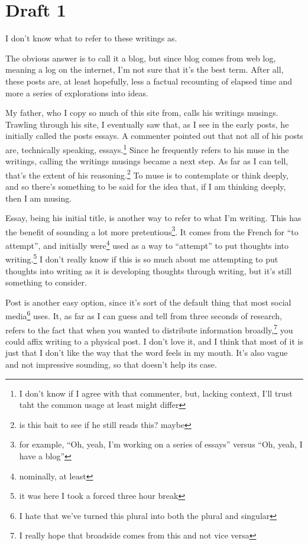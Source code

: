 \documentclass[12pt]{article}
\newcommand{\say}[1]{``#1''}
\renewcommand{\,}{\textsuperscript{,}}
\begin{document}
\section{Draft 1}

I don't know what to refer to these writings as.

The obvious answer is to call it a blog, but since blog comes from web log, meaning a log on the internet, I'm not sure that it's the best term.  
After all, these posts are, at least hopefully, less a factual recounting of elapsed time and more a series of explorations into ideas.

My father, who I copy so much of this site from, calls his writings musings.  
Trawling through his site, I eventually saw that, as I see in the early posts, he initially called the posts essays.  
A commenter pointed out that not all of his posts are, technically speaking, essays.\footnote{I don't know if I agree with that commenter, but, lacking context, I'll trust taht the common usage at least might differ}  
Since he frequently refers to his muse in the writings, calling the writings musings became a next step.  
As far as I can tell, that's the extent of his reasoning.\footnote{is this bait to see if he still reads this? maybe}  
To muse is to contemplate or think deeply, and so there's something to be said for the idea that, if I am thinking deeply, then I am musing.

Essay, being his initial title, is another way to refer to what I'm writing.  
This has the benefit of sounding a lot more pretentious\footnote{for example, \say{Oh, yeah, I'm working on a series of essays} versus \say{Oh, yeah, I have a blog}}.  
It comes from the French for \say{to attempt}, and initially were\footnote{nominally, at least} used as a way to \say{attempt} to put thoughts into writing.\footnote{it was here I took a forced three hour break}  
I don't really know if this is so much about me attempting to put thoughts into writing as it is developing thoughts through writing, but it's still something to consider.

Post is another easy option, since it's sort of the default thing that most social media\footnote{I hate that we've turned this plural into both the plural and singular} uses.  
It, as far as I can guess and tell from three seconds of research, refers to the fact that when you wanted to distribute information broadly,\footnote{I really hope that broadside comes from this and not vice versa} you could affix writing to a physical post.  
I don't love it, and I think that most of it is just that I don't like the way that the word feels in my mouth.  
It's also vague and not impressive sounding, so that doesn't help its case.
\end{document}
